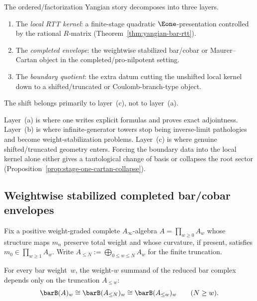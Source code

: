 \begin{definition}
\label{def:three-layers-ordered-theory}
The ordered/factorization Yangian story decomposes into three layers.
\begin{enumerate}[label=\textup{(\alph*)}]
\item The \emph{local RTT kernel}: a finite-stage quadratic
 $\Eone$-presentation controlled by the rational $R$-matrix
 (Theorem~\ref{thm:yangian-bar-rtt}).
\item The \emph{completed envelope}: the weightwise stabilized
 bar/cobar or Maurer--Cartan object in the completed/pro-nilpotent
 setting.
\item The \emph{boundary quotient}: the extra datum cutting the
 unshifted local kernel down to a shifted/truncated or
 Coulomb-branch-type object.
\end{enumerate}
The shift belongs primarily to layer~\textup{(c)}, not to
layer~\textup{(a)}.
\end{definition}

\begin{remark}
\label{rem:three-layer-distinction}
Layer~(a) is where one writes explicit formulas and proves exact
adjointness. Layer~(b) is where infinite-generator towers stop being
inverse-limit pathologies and become weight-stabilization problems.
Layer~(c) is where genuine shifted/truncated geometry enters.
Forcing the boundary data into the local kernel alone either
gives a tautological change of basis or collapses the root sector
(Proposition~\ref{prop:stage-one-cartan-collapse}).
\end{remark}


\subsection{Weightwise stabilized completed bar/cobar envelopes}
\label{subsec:weightwise-stabilized-bar-cobar}

Fix a positive weight-graded complete $A_\infty$-algebra
$A = \prod_{w \ge 0} A_w$ whose structure maps $m_n$ preserve
total weight and whose curvature, if present, satisfies
$m_0 \in \prod_{w \ge 1} A_w$. Write
$A_{\le N} := \bigoplus_{0 \le w \le N} A_w$ for the finite
truncation.

\begin{lemma}
\label{lem:shifted-rtt-bar-stabilization}
For every bar weight~$w$, the weight-$w$ summand of the reduced bar
complex depends only on the truncation $A_{\le w}$:
\[
\barB(A)_w \cong \barB(A_{\le N})_w \cong \barB(A_{\le w})_w
\qquad (N \ge w).
\]
\end{lemma}

